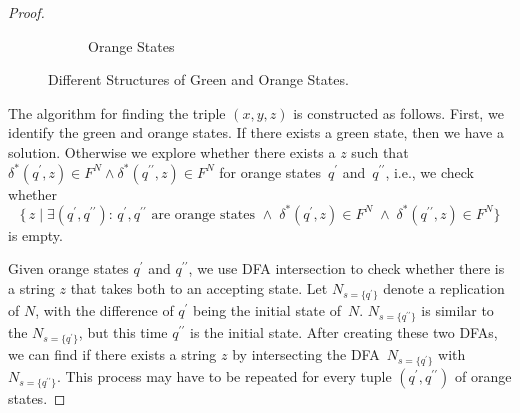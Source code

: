 \documentclass{lmcs} %
\theoremstyle{plain}\newtheorem{satz}[thm]{Satz} %
\newcommand{\ignore}[1]{}
\begin{document}
\begin{appendices}
\begin{proof}
\begin{figure}[h]
\begin{subfigure}{.5\textwidth}
\caption{Orange States}
  \label{fig:sub2}
\end{subfigure}
\caption{Different Structures of Green and Orange States.}
\label{fig:GOStates}
\end{figure}

The algorithm for finding the triple $(x, y, z)$ is constructed
as follows. First, we identify the green and orange states. If
there exists a green state, then we have a solution. Otherwise we
explore whether there exists a $z$ such that $\delta_{}^*(q^{\prime},
z) \in F^{N} \land \delta_{}^*(q^{\prime\prime}, z) \in F^{N}$
for orange states~$q_{}^{\prime}$
and~$q_{}^{\prime\prime}$, i.e., we check whether \[ \big\{ \, z \; \big| \; \exists (q^{\prime}, q^{\prime\prime}) : \, q^{\prime}, q^{\prime\prime} \text{ are
  orange states } \land \; \delta_{}^*(q^{\prime},z) \in F^{N} \; \land \; 
  \delta_{}^*(q^{\prime\prime},z) \in F^{N} \big\} \] is empty.

Given orange states
$q^{\prime}$ and $q^{\prime\prime}$, we use DFA intersection to check whether there is
a string $z$ that takes both to an accepting state.
Let $N_{s=\{q^{\prime}\}}$ denote a
replication of $N$, with the difference of $q^{\prime}$ being the initial state
of~$N$. $N_{s=\{q^{\prime\prime}\}}$ is similar to the $N_{s=\{q^{\prime}\}}$, but
this time $q^{\prime\prime}$ is the initial state. After creating these two
DFAs, we can find if there exists a string $z$ by intersecting the
DFA~$N_{s=\{q^{\prime}\}}$ with~$N_{s=\{q^{\prime\prime}\}}$. 
This process may have to be repeated for every tuple $(q^{\prime},
q^{\prime\prime})$ of orange states. \qedhere
\end{proof}

  \ignore{
        Given $x, y \in \mathcal{L}( M_1^{} )$, \emph{and} \mbox{$xz, yz \in \mathcal{L}( M_2^{} )$}, we can extract $z$ by taking the quotient of languages $\mathcal{L}( M_1^{} )$ and $\mathcal{L}( M_2^{} )$ , such that $z \in 		\mathcal{L}( M_2^{} ) \backslash \mathcal{L}( M_1^{} )$.
        
        The quotient of the languages $\mathcal{L}( M_1^{} )$ and $\mathcal{L}( M_2^{} )$ can be find by using \emph{Lemma~\ref{FindMEFA}}. Pay attention to the fact that the quotient of the languages creates a \emph{MEFA}, 		which has more than 1 initial state.
        
}
\end{appendices}
\end{document}

